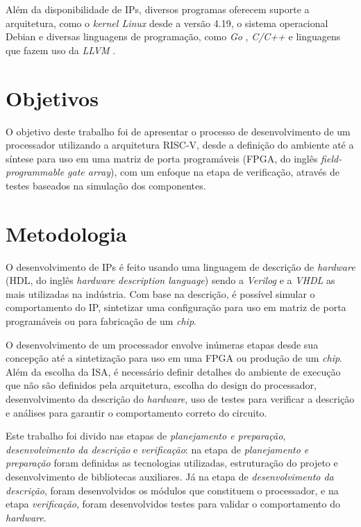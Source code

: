 Além da disponibilidade de IPs, diversos
programas oferecem suporte a arquitetura, como o \emph{kernel Linux} desde a versão 4.19, o
sistema operacional Debian \citep{RVDB} e diversas
linguagens de programação, como \emph{Go} \citep{GOL}, \emph{C/C++} \citep{RVGCC} e
linguagens que fazem uso da \emph{LLVM} \citep{RVLLVM}.

\section{Objetivos}
\label{sec:io}

O objetivo deste trabalho foi de apresentar o processo de desenvolvimento de um processador 
utilizando a arquitetura RISC-V, desde a definição do ambiente até a síntese para uso em uma 
matriz de porta programáveis (FPGA, do inglês \emph{field-programmable gate array}), com um enfoque na etapa de verificação,
através de testes baseados na simulação dos componentes.

\section{Metodologia}
\label{sec:im}

O desenvolvimento de IPs é feito usando uma linguagem de descrição de \emph{hardware} 
(HDL, do inglês \emph{hardware description language}) sendo a \emph{Verilog} e a 
\emph{VHDL} as mais utilizadas na indústria. Com base na descrição, é possível 
simular o comportamento do IP, sintetizar uma configuração para uso em 
matriz de porta programáveis ou para fabricação de um \emph{chip}.

O desenvolvimento de um processador envolve inúmeras etapas desde sua concepção até a sintetização para
uso em uma FPGA ou produção de um \emph{chip}. 
Além da escolha da ISA, é necessário definir detalhes do ambiente 
de execução que não são definidos pela arquitetura, escolha do design do processador, desenvolvimento da 
descrição do \emph{hardware}, uso de testes para verificar a descrição e análises para garantir o comportamento
correto do circuito.

Este trabalho foi divido nas etapas de \emph{planejamento e preparação}, 
\emph{desenvolvimento da descrição} e \emph{verificação}:
na etapa de \emph{planejamento e preparação} foram definidas as tecnologias utilizadas,
estruturação do projeto e desenvolvimento de bibliotecas auxiliares. Já
na etapa de \emph{desenvolvimento da descrição}, foram desenvolvidos os módulos que constituem o
processador, e na etapa
\emph{verificação}, foram desenvolvidos testes para validar o comportamento do \emph{hardware}.

